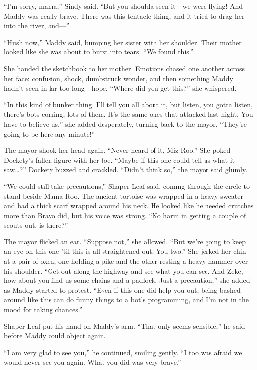 \documentclass[10pt]{article}
\begin{document}
``I'm sorry, mama,'' Sindy said. ``But you shoulda seen it---we were
flying! And Maddy was really brave. There was this tentacle thing, and
it tried to drag her into the river, and---''

``Hush now,'' Maddy said, bumping her sister with her shoulder. Their
mother looked like she was about to burst into tears. ``We found this.''

She handed the sketchbook to her mother. Emotions chased one another
across her face: confusion, shock, dumbstruck wonder, and then something
Maddy hadn't seen in far too long---hope. ``Where did you get this?''
she whispered.

``In this kind of bunker thing. I'll tell you all about it, but listen,
you gotta listen, there's bots coming, lots of them. It's the same ones
that attacked last night. You have to believe us,'' she added
desperately, turning back to the mayor. ``They're going to be here any
minute!''

The mayor shook her head again. ``Never heard of it, Miz Roo.'' She
poked Dockety's fallen figure with her toe. ``Maybe if this one could
tell us what it saw\ldots{}?'' Dockety buzzed and crackled. ``Didn't
think so,'' the mayor said glumly.

``We could still take precautions,'' Shaper Leaf said, coming through
the circle to stand beside Mama Roo. The ancient tortoise was wrapped in
a heavy sweater and had a thick scarf wrapped around his neck. He looked
like he needed crutches more than Bravo did, but his voice was strong.
``No harm in getting a couple of scouts out, is there?''

The mayor flicked an ear. ``Suppose not,'' she allowed. ``But we're
going to keep an eye on this one 'til this is all straightened out. You
two.'' She jerked her chin at a pair of oxen, one holding a pike and the
other resting a heavy hammer over his shoulder. ``Get out along the
highway and see what you can see. And Zeke, how about you find us some
chains and a padlock. Just a precaution,'' she added as Maddy started to
protest. ``Even if this one did help you out, being bashed around like
this can do funny things to a bot's programming, and I'm not in the mood
for taking chances.''

Shaper Leaf put his hand on Maddy's arm. ``That only seems sensible,''
he said before Maddy could object again.

``I am very glad to see you,'' he continued, smiling gently. ``I too was
afraid we would never see you again. What you did was very brave.''
\end{document}
